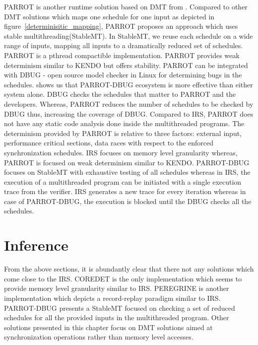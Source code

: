 PARROT is another runtime solution based on DMT from \citet{parrot}. 
Compared to other DMT solutions which maps one schedule for one input as depicted in figure~\ref{determinisitic_mapping}, PARROT proposes an approach which uses stable multithreading(StableMT). 
In StableMT, we reuse each schedule on a wide range of inputs, mapping all inputs to a dramatically reduced set of schedules. 
PARROT is a pthread compactible implementation. 
PARROT provides weak determinism similar to KENDO but offers stability. 
PARROT can be integrated with DBUG\citep{dbug} - open source model checker in Linux for determining bugs in the schedules. 
\citet{parrot} shows us that PARROT-DBUG ecosystem is more effective than either system alone. 
DBUG checks the schedules that matter to PARROT and the developers. 
Whereas, PARROT reduces the number of schedules to be checked by DBUG thus, increasing the coverage of DBUG. 
Compared to IRS, PARROT does not have any static code analysis done inside the multithreaded programs. 
The determinism provided by PARROT is relative to three factors: external input, performance critical sections, data races with respect to the enforced synchronization schedules. 
IRS focuses on memory level granularity whereas, PARROT is focused on weak determinism similar to KENDO. 
PARROT-DBUG focuses on StableMT with exhaustive testing of all schedules whereas in IRS, the execution of a multithreaded program can be initiated with a single execution trace from the verifier. 
IRS generates a new trace for every iteration whereas in case of PARROT-DBUG, the execution is blocked until the DBUG checks all the schedules.

\section*{Inference}

From the above sections, it is abundantly clear that there not any solutions which come close to the IRS. 
COREDET is the only implementation which seems to provide memory level granularity similar to IRS. 
PEREGRINE is another implementation which depicts a record-replay paradigm similar to IRS. 
PARROT-DBUG presents a StableMT focused on checking a set of reduced schedules for all the provided inputs in the multithreaded program. 
Other solutions presented in this chapter focus on DMT solutions aimed at synchronization operations rather than memory level accesses. 

